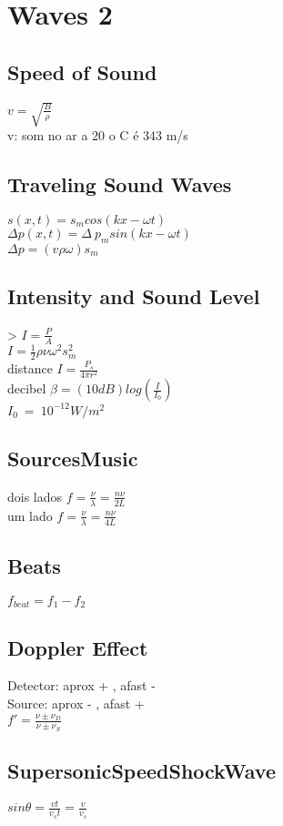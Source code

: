 \section{Waves 2}
\subsection*{Speed of Sound}
$v=\sqrt{\frac{B}{\rho }}$\\
v: som no ar a 20 o C é 343 m/s\\
\subsection*{Traveling Sound Waves}
$s\left(x,t\right)=s_mcos\left(kx-\omega t\right)$\\
$\Delta p\left(x,t\right)=\Delta \:p_msin\left(kx-\omega t\right)$\\
$\Delta p=\left(v\rho \omega \right)s_m$\\
\subsection*{Intensity and Sound Level}
> $I=\frac{P}{A}$\\
$I=\frac{1}{2}\rho \nu \omega ^2s_m^2$\\
distance $I=\frac{P_s}{4\pi r^2}$\\
decibel $\beta =\left(10dB\right)log\left(\frac{I}{I_0}\right)$\\
$I_0\:=\:10^{-12} W/m^2$\\
\subsection*{SourcesMusic}
dois lados $f=\frac{\nu }{\lambda }=\frac{n\nu }{2L}$\\
um lado $f=\frac{\nu }{\lambda }=\frac{n\nu }{4L}$\\
\subsection*{Beats}
$f_{beat}=f_1-f_2$\\
\subsection*{Doppler Effect}
Detector: aprox + , afast - \\
Source: aprox - , afast + \\
$f'=\frac{\nu \pm \nu _D}{\nu \pm \nu _S}$\\
\subsection*{SupersonicSpeedShockWave}
$sin\theta =\frac{vt}{v_st}=\frac{v}{v_s}$\\